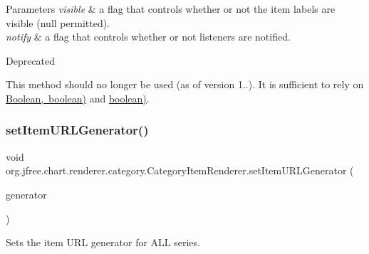 \begin{DoxyParams}{Parameters}
{\em visible} & a flag that controls whether or not the item labels are visible ({\ttfamily null} permitted). \\
\hline
{\em notify} & a flag that controls whether or not listeners are notified.\\
\hline
\end{DoxyParams}
\begin{DoxyRefDesc}{Deprecated}
\item[\mbox{\hyperlink{deprecated__deprecated000166}{Deprecated}}]This method should no longer be used (as of version 1..). It is sufficient to rely on \mbox{\hyperlink{}{Boolean, boolean)}} and \mbox{\hyperlink{interfaceorg_1_1jfree_1_1chart_1_1renderer_1_1category_1_1_category_item_renderer_aa5ff4e5470281bba0293eaf802fb114d}{boolean)}}. \end{DoxyRefDesc}
\mbox{\label{interfaceorg_1_1jfree_1_1chart_1_1renderer_1_1category_1_1_category_item_renderer_ab208309306871c44b6ea1d85382d534e}} 
\subsubsection{\texorpdfstring{set\+Item\+U\+R\+L\+Generator()}{setItemURLGenerator()}}
{\footnotesize\ttfamily void org.\+jfree.\+chart.\+renderer.\+category.\+Category\+Item\+Renderer.\+set\+Item\+U\+R\+L\+Generator (\begin{DoxyParamCaption}\item[{\mbox{\hyperlink{interfaceorg_1_1jfree_1_1chart_1_1urls_1_1_category_u_r_l_generator}{Category\+U\+R\+L\+Generator}}}]{generator }\end{DoxyParamCaption})}

Sets the item U\+RL generator for A\+LL series.


